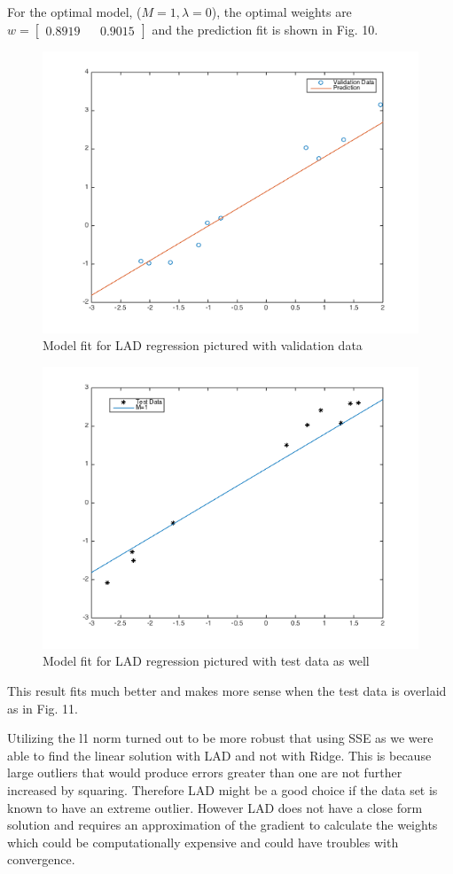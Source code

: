\documentclass[10pt,twocolumn]{article}
\begin{document}
For the optimal model, ($M=1, \lambda = 0$), the optimal weights are $w= \begin{bmatrix} 0.8919  &&   0.9015 \end{bmatrix}$ and the prediction fit is shown in Fig. 10. 
\begin{figure}[H]
\center
\includegraphics[scale =.36]{4_1.png}
\caption{Model fit for LAD regression pictured with validation data}
\end{figure}

\begin{figure}[H]
\center
\includegraphics[scale =.35]{4_1test.png}
\caption{Model fit for LAD regression pictured with test data as well}
\end{figure}

This result fits much better and makes more sense when the test data is overlaid as in Fig. 11. 


Utilizing the l1 norm turned out to be more robust that using SSE as we were able to find the linear solution with LAD and not with Ridge. This is because large outliers that would produce errors greater than one are not further increased by squaring. Therefore LAD might be a good choice if the data set is known to have an extreme outlier. However LAD does not have a close form solution and requires an approximation of the gradient to calculate the weights which could be computationally expensive and could have troubles with convergence. 
 
 
\end{document}
